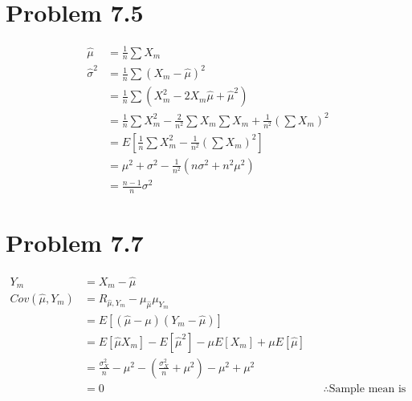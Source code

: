 \documentclass[12pt]{article}
\begin{document}
\section{Problem 7.5}
\begin{align*}
  \hat\mu &= \frac{1}{n}\sum X_m \\
  \hat\sigma^2 &= \frac{1}{n}\sum (X_m-\hat\mu)^2 \\
  &= \frac{1}{n}\sum \left(X_m^2-2X_m\hat\mu + \hat\mu^2\right) \\
  &= \frac{1}{n}\sum X_m^2 -\frac{2}{n^2} \sum X_m \sum X_m + \frac{1}{n^2}\left(\sum X_m\right)^2 \\
  &= E\left[\frac{1}{n}\sum X_m^2 -\frac{1}{n^2} \left(\sum X_m\right)^2\right] \\
  &= \mu^2 + \sigma^2 - \frac{1}{n^2}\left( n\sigma^2 + n^2\mu^2 \right) \\
  &= \frac{n-1}{n}\sigma^2
\end{align*}

\section{Problem 7.7}
\begin{align*}
  Y_m &= X_m - \hat\mu \\
  Cov(\hat\mu,Y_m) &= R_{\hat\mu,Y_m} - \mu_{\hat\mu}\mu_{Y_m} \\
  &= E\left[ (\hat\mu - \mu)(Y_{m} - \hat\mu) \right] \\
  &= E[\hat\mu X_m] - E[\hat\mu^2] - \mu E[X_m] + \mu E[\hat\mu] \\
  &= \frac{\sigma_X^2}{n} - \mu^2 - (\frac{\sigma_X^2}{n} + \mu^2) - \mu^2 + \mu^2 \\
  &= 0 & & \therefore \textrm{Sample mean is independent of sample variance.}
\end{align*}
\end{document}
